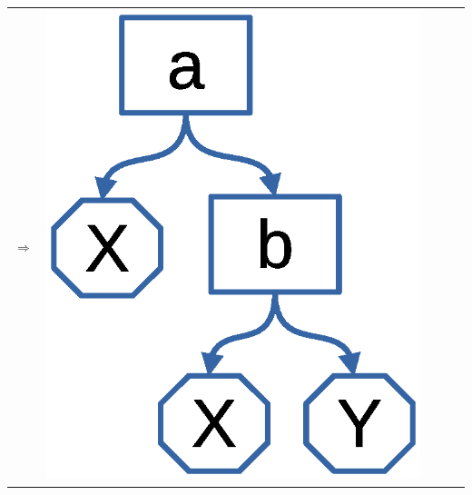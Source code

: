 \documentclass{../../slides-style}
\begin{document}
\begin{frame}
\begin{tabular}{m{25mm}cm{25mm}cm{25mm}}
    \textbf{\Huge $\Rightarrow$} &
    \pause     
    \includegraphics[scale=0.4]{term1.eps}
    \end{tabular}
    \end{frame}
\end{document}
